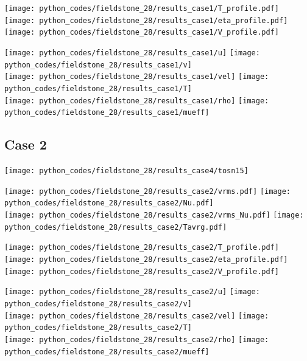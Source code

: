 \begin{center}
\texttt{[image: python\_codes/fieldstone\_28/results\_case1/T\_profile.pdf]}
\texttt{[image: python\_codes/fieldstone\_28/results\_case1/eta\_profile.pdf]}
\texttt{[image: python\_codes/fieldstone\_28/results\_case1/V\_profile.pdf]}
\end{center}
\newpage
\begin{center}
\texttt{[image: python\_codes/fieldstone\_28/results\_case1/u]}
\texttt{[image: python\_codes/fieldstone\_28/results\_case1/v]}\\
\texttt{[image: python\_codes/fieldstone\_28/results\_case1/vel]}
\texttt{[image: python\_codes/fieldstone\_28/results\_case1/T]}\\
\texttt{[image: python\_codes/fieldstone\_28/results\_case1/rho]}
\texttt{[image: python\_codes/fieldstone\_28/results\_case1/mueff]}
\end{center}









\newpage %
\subsection*{Case 2}

\texttt{[image: python\_codes/fieldstone\_28/results\_case4/tosn15]}

\begin{center}
\texttt{[image: python\_codes/fieldstone\_28/results\_case2/vrms.pdf]}
\texttt{[image: python\_codes/fieldstone\_28/results\_case2/Nu.pdf]}\\
\texttt{[image: python\_codes/fieldstone\_28/results\_case2/vrms\_Nu.pdf]}
\texttt{[image: python\_codes/fieldstone\_28/results\_case2/Tavrg.pdf]}
\end{center}

\begin{center}
\texttt{[image: python\_codes/fieldstone\_28/results\_case2/T\_profile.pdf]}
\texttt{[image: python\_codes/fieldstone\_28/results\_case2/eta\_profile.pdf]}
\texttt{[image: python\_codes/fieldstone\_28/results\_case2/V\_profile.pdf]}
\end{center}

\newpage
\begin{center}
\texttt{[image: python\_codes/fieldstone\_28/results\_case2/u]}
\texttt{[image: python\_codes/fieldstone\_28/results\_case2/v]}\\
\texttt{[image: python\_codes/fieldstone\_28/results\_case2/vel]}
\texttt{[image: python\_codes/fieldstone\_28/results\_case2/T]}\\
\texttt{[image: python\_codes/fieldstone\_28/results\_case2/rho]}
\texttt{[image: python\_codes/fieldstone\_28/results\_case2/mueff]}
\end{center}




